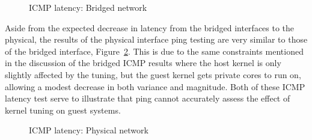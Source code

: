 \begin{figure}
    \centering
    \def\svgwidth{\columnwidth}
    
    \caption{ICMP latency: Bridged network}
    \label{fig:icmplatencybridge}
\end{figure}
Aside from the expected decrease in latency from the bridged interfaces to the physical, the results of the physical interface ping testing are very similar to those of the bridged interface, Figure~\ref{fig:icmplatencyphys}.  
This is due to the same constraints mentioned in the discussion of the bridged ICMP results where the host kernel is only slightly affected by the tuning, but the guest kernel gets private cores to run on, allowing a modest decrease in both variance and magnitude.  
Both of these ICMP latency test serve to illustrate that ping cannot accurately assess the effect of kernel tuning on guest systems.  

\begin{figure}
    \centering
    \def\svgwidth{\columnwidth}
    
    \caption{ICMP latency: Physical network}
    \label{fig:icmplatencyphys}
\end{figure}

